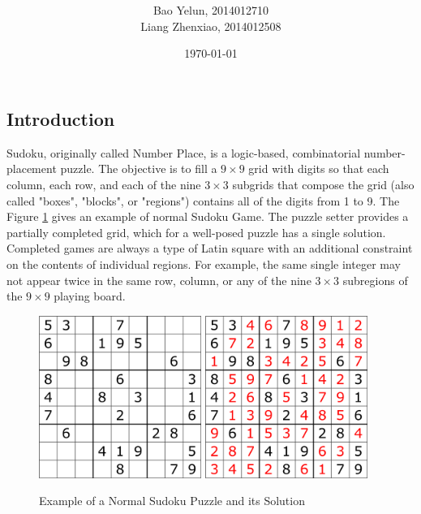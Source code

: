 \documentclass[12pt]{article}
\title{\textmd{\bf \Title}}
\date{\today}
\author{Bao Yelun,  2014012710\\Liang Zhenxiao, 2014012508}
\begin{document}
\begin{spacing}{1.1}
\maketitle \thispagestyle{empty}

\section{Introduction}

Sudoku, originally called Number Place, is a logic-based, combinatorial number-placement puzzle. The objective is to fill a $ 9\times9 $ grid with digits so that each column, each row, and each of the nine $ 3\times3 $ subgrids that compose the grid (also called "boxes", "blocks", or "regions") contains all of the digits from 1 to 9. The Figure \ref{Fig:NormalSudoku} gives an example of normal Sudoku Game. The puzzle setter provides a partially completed grid, which for a well-posed puzzle has a single solution. Completed games are always a type of Latin square with an additional constraint on the contents of individual regions. For example, the same single integer may not appear twice in the same row, column, or any of the nine $ 3\times3 $ subregions of the $ 9\times9 $ playing board.

\begin{figure}[h]
	\label{Fig:NormalSudoku}
	\centering
	\includegraphics[width=150pt]{pic1.png}
	\hspace{30pt}
	\includegraphics[width=150pt]{pic2.png}
	\caption{Example of a Normal Sudoku Puzzle and its Solution}
\end{figure}


\end{spacing}
\end{document}
